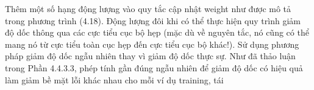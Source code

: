 Thêm một số hạng động lượng vào quy tắc cập nhật weight như được mô tả trong phương trình (4.18). Động lượng đôi khi có thể thực hiện quy trình giảm độ dốc thông qua các cực tiểu cục bộ hẹp (mặc dù về nguyên tắc, nó cũng có thể mang nó từ cực tiểu toàn cục hẹp đến cực tiểu cục bộ khác!). Sử dụng phương pháp giảm độ dốc ngẫu nhiên thay vì giảm độ dốc thực sự. Như đã thảo luận trong Phần 4.4.3.3, phép tính gần đúng ngẫu nhiên để giảm độ dốc có hiệu quả làm giảm bề mặt lỗi khác nhau cho mỗi ví dụ training, tái

